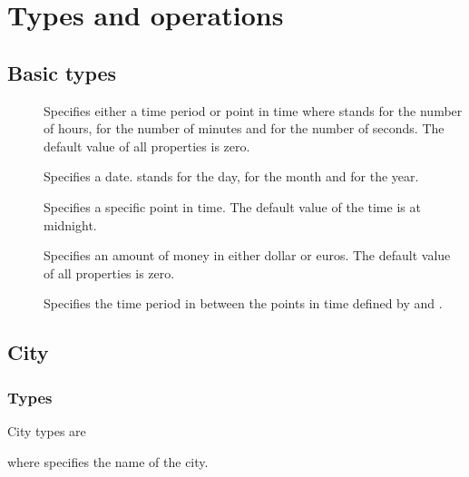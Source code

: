 \section{Types and operations}
\label{sec:operations}

\subsection{Basic types}
\begin{description}
  \item[] 

    Specifies either a time period or point in time where  stands for the
    number of hours,  for the number of minutes and  for the
    number of seconds. The default value of all properties is zero.
  \item[] 

    Specifies a date.  stands for the day,  for the month and
     for the year.
  \item[] 

    Specifies a specific point in time. The default value of the time is at
    midnight.
  \item[] 

    Specifies an amount of money in either dollar or euros. The default value of
    all properties is zero.
  \item[] 

    Specifies the time period in between the points in time defined by
     and .
\end{description}

\subsection{City}
\subsubsection{Types}
City types are
\begin{description}
  \item[] 
  \item[] 
\end{description}
where  specifies the name of the city. 

